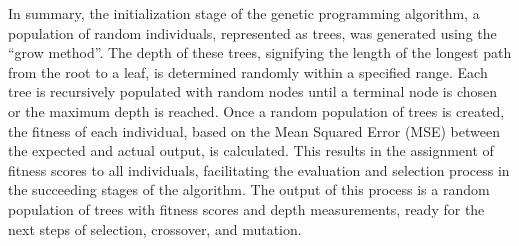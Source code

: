   
  In summary, the initialization stage of the genetic programming algorithm, a 
  population of random individuals, represented as trees, was generated using 
  the \enquote{grow method}.
  The depth of these trees, signifying the length of the longest path from the
  root to a leaf, is determined randomly within a specified range.
  Each tree is recursively populated with random nodes until a terminal node is
  chosen or the maximum depth is reached.
  Once a random population of trees is created, the fitness of each individual,
  based on the Mean Squared Error (MSE) between the expected and actual output,
  is calculated.
  This results in the assignment of fitness scores to all individuals,
  facilitating the evaluation and selection process in the succeeding stages of
  the algorithm.
  The output of this process is a random population of trees with fitness scores
  and depth measurements, ready for the next steps of selection, crossover, and
  mutation.
